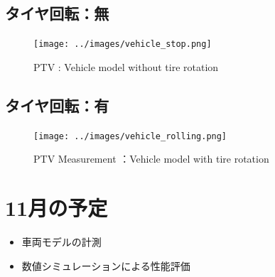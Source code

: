\documentclass[twocolumn,a4j]{jsarticle}
\begin{document}
\subsection{タイヤ回転：無}
\begin{figure}[htbp]
	\centering
	\texttt{[image: ../images/vehicle\_stop.png]}
	\caption{PTV : Vehicle model without tire rotation}
\end{figure}


\subsection{タイヤ回転：有}
\begin{figure}[htbp]
	\centering
	\texttt{[image: ../images/vehicle\_rolling.png]}
	\caption{PTV Measurement ：Vehicle model with tire rotation}
\end{figure}



\section{11月の予定}
\begin{itemize}
	\item 車両モデルの計測
	\item 数値シミュレーションによる性能評価
\end{itemize}
\end{document}

